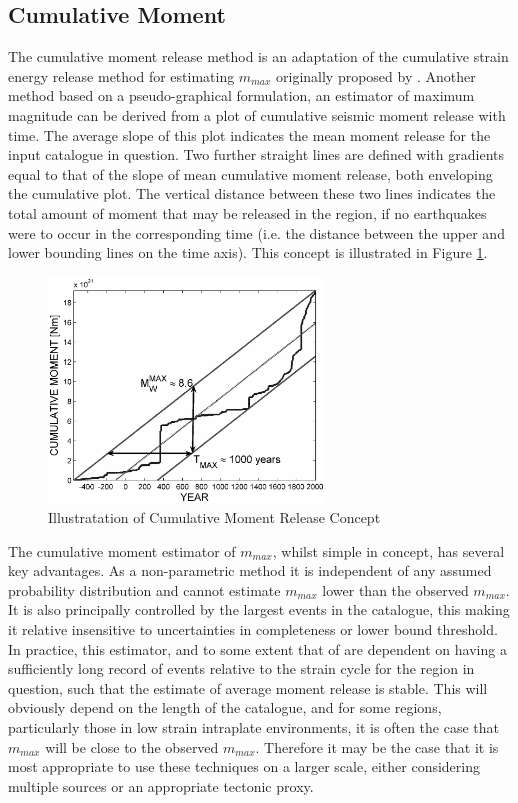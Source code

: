 \subsection{Cumulative Moment \parencite{MakropoulosBurton1983}}

The cumulative moment release method is an adaptation of the cumulative strain energy release method for estimating $m_{max}$ originally proposed by \textcite{MakropoulosBurton1983}. Another method based on a pseudo-graphical formulation, an estimator of maximum magnitude can be derived from a plot of cumulative seismic moment release with time. The average slope of this plot indicates the mean moment release for the input catalogue in question. Two further straight lines are defined with gradients equal to that of the slope of mean cumulative moment release, both enveloping the cumulative plot. The vertical distance between these two lines indicates the total amount of moment that may be released in the region, if no earthquakes were to occur in the corresponding time (i.e. the distance between the upper and lower bounding lines on the time axis). This concept is illustrated in Figure \ref{fig:Cumulative_Moment}. 

\begin{figure}[htb]
	\centering
		\includegraphics[height=6cm, keepaspectratio=true]{./figures/Cumulative_Moment.eps}
	\caption{Illustratation of Cumulative Moment Release Concept}
	\label{fig:Cumulative_Moment}
\end{figure}

The cumulative moment estimator of $m_{max}$, whilst simple in concept, has several key advantages. As a non-parametric method it is independent of any assumed probability distribution and cannot estimate $m_{max}$ lower than the observed $m_{max}$. It is also principally controlled by the largest events in the catalogue, this making it relative insensitive to uncertainties in completeness or lower bound threshold. In practice, this estimator, and to some extent that of \textcite{Kijko2004} are dependent on having a sufficiently long record of events relative to the strain cycle for the region in question, such that the estimate of average moment release is stable. This will obviously depend on the length of the catalogue, and for some regions, particularly those in low strain intraplate environments, it is often the case that $m_{max}$ will be close to the observed $m_{max}$. Therefore it may be the case that it is most appropriate to use these techniques on a larger scale, either considering multiple sources or an appropriate tectonic proxy.

